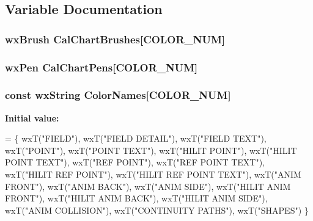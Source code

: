 \subsection{Variable Documentation}
\hypertarget{a00190_a6c3629e19bf641b92239c2f6d3b1dc47}{
\subsubsection[{Cal\-Chart\-Brushes}]{\setlength{\rightskip}{0pt plus 5cm}wx\-Brush Cal\-Chart\-Brushes\mbox{[}{\bf C\-O\-L\-O\-R\-\_\-\-N\-U\-M}\mbox{]}}}\label{a00190_a6c3629e19bf641b92239c2f6d3b1dc47}
\hypertarget{a00190_a798b4f2bd8507b50bef257293dd6acfa}{
\subsubsection[{Cal\-Chart\-Pens}]{\setlength{\rightskip}{0pt plus 5cm}wx\-Pen Cal\-Chart\-Pens\mbox{[}{\bf C\-O\-L\-O\-R\-\_\-\-N\-U\-M}\mbox{]}}}\label{a00190_a798b4f2bd8507b50bef257293dd6acfa}
\hypertarget{a00190_a7acbbf3434fafe32a73716825cf271aa}{
\subsubsection[{Color\-Names}]{\setlength{\rightskip}{0pt plus 5cm}const wx\-String Color\-Names\mbox{[}{\bf C\-O\-L\-O\-R\-\_\-\-N\-U\-M}\mbox{]}}}\label{a00190_a7acbbf3434fafe32a73716825cf271aa}
{\bfseries Initial value\-:}
\begin{DoxyCode}
=
\{
    wxT(\textcolor{stringliteral}{"FIELD"}),
    wxT(\textcolor{stringliteral}{"FIELD DETAIL"}),
    wxT(\textcolor{stringliteral}{"FIELD TEXT"}),
    wxT(\textcolor{stringliteral}{"POINT"}),
    wxT(\textcolor{stringliteral}{"POINT TEXT"}),
    wxT(\textcolor{stringliteral}{"HILIT POINT"}),
    wxT(\textcolor{stringliteral}{"HILIT POINT TEXT"}),
    wxT(\textcolor{stringliteral}{"REF POINT"}),
    wxT(\textcolor{stringliteral}{"REF POINT TEXT"}),
    wxT(\textcolor{stringliteral}{"HILIT REF POINT"}),
    wxT(\textcolor{stringliteral}{"HILIT REF POINT TEXT"}),
    wxT(\textcolor{stringliteral}{"ANIM FRONT"}),
    wxT(\textcolor{stringliteral}{"ANIM BACK"}),
    wxT(\textcolor{stringliteral}{"ANIM SIDE"}),
    wxT(\textcolor{stringliteral}{"HILIT ANIM FRONT"}),
    wxT(\textcolor{stringliteral}{"HILIT ANIM BACK"}),
    wxT(\textcolor{stringliteral}{"HILIT ANIM SIDE"}),
    wxT(\textcolor{stringliteral}{"ANIM COLLISION"}),
    wxT(\textcolor{stringliteral}{"CONTINUITY PATHS"}),
    wxT(\textcolor{stringliteral}{"SHAPES"})
\}
\end{DoxyCode}
